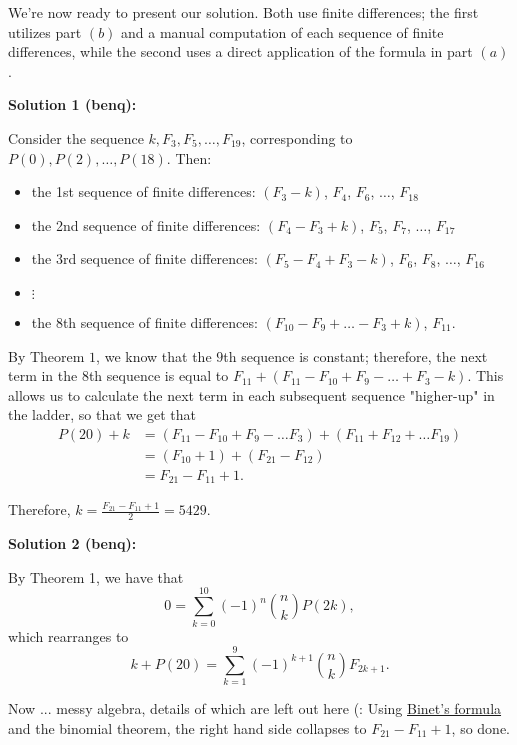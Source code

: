 We're now ready to present our solution. Both use finite differences; the first utilizes part $(b)$ and a manual computation of each sequence of finite differences, while the second uses a direct application of the formula in part $(a)$. \newpage

\begin{solution}
\textbf{Solution 1 (benq)}\textbf{:}\V

Consider the sequence $k, F_3, F_5, \hdots, F_{19}$, corresponding to $P(0), P(2), \hdots, P(18)$. Then: 
\begin{itemize}
    \item the 1st sequence of finite differences: $(F_3-k)$, $F_4$, $F_6$, $\hdots$, $F_{18}$ 
    \item the 2nd sequence of finite differences: $(F_4-F_3+k)$, $F_5$, $F_7$, $\hdots$, $F_{17}$
    \item the 3rd sequence of finite differences: $(F_5-F_4+F_3-k)$, $F_6$, $F_8$, $\hdots$, $F_{16}$
    \item $\vdots$
    \item the 8th sequence of finite differences: $(F_{10}-F_9+\hdots -F_3+k)$, $F_{11}$. 
\end{itemize}

By Theorem $1$, we know that the $9$th sequence is constant; therefore, the next term in the $8$th sequence is equal to $F_{11} + (F_{11}-F_{10}+F_9-\hdots +F_3-k)$. This allows us to calculate the next term in each subsequent sequence "higher-up" in the ladder, so that we get that 
\begin{align*}
    P(20)+k &= (F_{11}-F_{10}+F_9-\hdots F_3) + (F_{11}+F_{12}+\hdots F_{19}) \\
    &= (F_{10}+1) + (F_{21}-F_{12}) \\ 
    &= F_{21} - F_{11} + 1.
\end{align*}

Therefore, $k = \frac{F_{21}-F_{11}+1}{2} = 5429$.
\end{solution}\V


\begin{solution}
\textbf{Solution 2 (benq)}\textbf{:}\V

By Theorem 1, we have that 
\[0 = \sum_{k=0}^{10}(-1)^n\binom{n}{k}P(2k),\]
which rearranges to 
\[k+P(20) = \sum_{k=1}^{9}(-1)^{k+1}\binom{n}{k}F_{2k+1}.\]

Now ... messy algebra, details of which are left out here (:\newline
Using \href{https://artofproblemsolving.com/wiki/index.php/Binet\%27s_Formula}{Binet's formula} and the binomial theorem, the right hand side collapses to $F_{21}-F_{11}+1$, so done.
\end{solution}